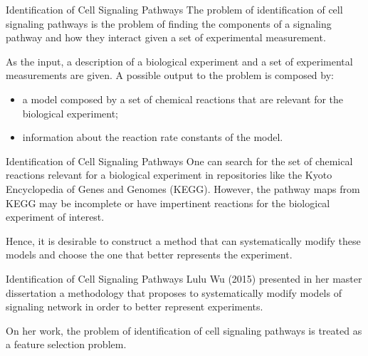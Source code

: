 \documentclass{beamer}
\newcommand{\powerset}{\mathcal{P}}
\begin{document}
\begin{frame}{Identification of Cell Signaling Pathways}
The problem of identification of cell signaling pathways is the problem
of finding the components of a signaling pathway and how they interact
given a set of experimental measurement.

\pause
As the input, a description of a biological experiment and a set of 
experimental measurements are given. \pause A possible output to the 
problem is composed by:
\begin{itemize}
    \pause
    \item{a model composed by a set of chemical reactions that are 
        relevant for the biological experiment;}
    \pause
    \item{information about the reaction rate constants of the model.}
\end{itemize}
\end{frame}


\begin{frame}{Identification of Cell Signaling Pathways}
One can search for the set of chemical reactions relevant for a 
biological experiment in repositories like the Kyoto Encyclopedia of 
Genes and Genomes (KEGG). \pause However, the pathway maps from KEGG may
be incomplete or have impertinent reactions for the biological 
experiment of interest.
\pause

Hence, it is desirable to construct a method that can systematically 
modify these models and choose the one that better represents the 
experiment.
\end{frame}


\begin{frame}{Identification of Cell Signaling Pathways}
Lulu Wu (2015) presented in her master dissertation a methodology that 
proposes to systematically modify models of signaling network in order
to better represent experiments.
\pause

On her work, the problem of identification of cell signaling pathways is
treated as a feature selection problem.
\end{frame}


\end{document}
